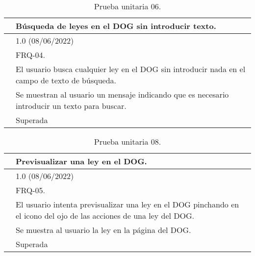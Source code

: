 \begin{table}[H]
\begin{center}
\begin{tabular}{|p{3cm}|p{10cm}|} \hline
\centering {\bf PU-07} & Búsqueda de leyes en el DOG sin introducir texto.  \\ \hline\hline
\centering {\bf Versión} & 1.0 (08/06/2022) \\ \hline
\centering {\bf Dependencias} & FRQ-04. \\ \hline
\centering {\bf Descripción} &  El usuario busca cualquier ley en el DOG sin introducir nada en el campo de texto de búsqueda. \\ \hline
\centering {\bf Criterio de aceptación} & Se muestran al usuario un mensaje indicando que es necesario introducir un texto para buscar. \\ \hline
\centering {\bf Estado} & Superada \\ \hline
\end{tabular}
\caption{Prueba unitaria 06.}
\label{enlacePU7}
\end{center}
\end{table}

\begin{table}[H]
\begin{center}
\begin{tabular}{|p{3cm}|p{10cm}|} \hline
\centering {\bf PU-08} & Previsualizar una ley en el DOG.  \\ \hline\hline
\centering {\bf Versión} & 1.0 (08/06/2022) \\ \hline
\centering {\bf Dependencias} & FRQ-05. \\ \hline
\centering {\bf Descripción} &  El usuario intenta previsualizar una ley en el DOG pinchando en el icono del ojo de las acciones de una ley del DOG. \\ \hline
\centering {\bf Criterio de aceptación} & Se muestra al usuario la ley en la página del DOG. \\ \hline
\centering {\bf Estado} & Superada \\ \hline
\end{tabular}
\caption{Prueba unitaria 08.}
\label{enlacePU8}
\end{center}
\end{table}

